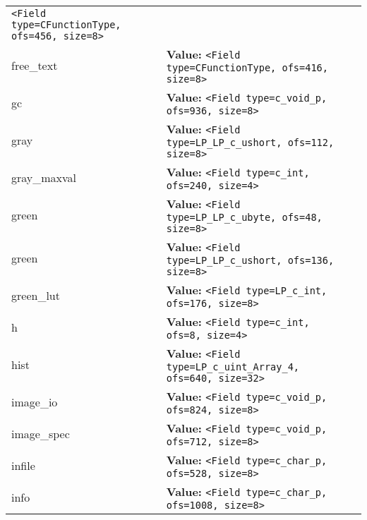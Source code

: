 \begin{longtable}{|p{\varnamewidth}|p{\vardescrwidth}|l}
{\tt {\textless}Field type=CFunctionType, ofs=456, size=8{\textgreater}}&\\
\cline{1-2}
\raggedright f\-r\-e\-e\-\_\-t\-e\-x\-t\- & \raggedright \textbf{Value:} 
{\tt {\textless}Field type=CFunctionType, ofs=416, size=8{\textgreater}}&\\
\cline{1-2}
\raggedright g\-c\- & \raggedright \textbf{Value:} 
{\tt {\textless}Field type=c\_void\_p, ofs=936, size=8{\textgreater}}&\\
\cline{1-2}
\raggedright g\-r\-a\-y\- & \raggedright \textbf{Value:} 
{\tt {\textless}Field type=LP\_LP\_c\_ushort, ofs=112, size=8{\textgreater}}&\\
\cline{1-2}
\raggedright g\-r\-a\-y\-\_\-m\-a\-x\-v\-a\-l\- & \raggedright \textbf{Value:} 
{\tt {\textless}Field type=c\_int, ofs=240, size=4{\textgreater}}&\\
\cline{1-2}
\raggedright g\-r\-e\-e\-n\- & \raggedright \textbf{Value:} 
{\tt {\textless}Field type=LP\_LP\_c\_ubyte, ofs=48, size=8{\textgreater}}&\\
\cline{1-2}
\raggedright g\-r\-e\-e\-n\-1\-6\- & \raggedright \textbf{Value:} 
{\tt {\textless}Field type=LP\_LP\_c\_ushort, ofs=136, size=8{\textgreater}}&\\
\cline{1-2}
\raggedright g\-r\-e\-e\-n\-\_\-l\-u\-t\- & \raggedright \textbf{Value:} 
{\tt {\textless}Field type=LP\_c\_int, ofs=176, size=8{\textgreater}}&\\
\cline{1-2}
\raggedright h\- & \raggedright \textbf{Value:} 
{\tt {\textless}Field type=c\_int, ofs=8, size=4{\textgreater}}&\\
\cline{1-2}
\raggedright h\-i\-s\-t\- & \raggedright \textbf{Value:} 
{\tt {\textless}Field type=LP\_c\_uint\_Array\_4, ofs=640, size=32{\textgreater}}&\\
\cline{1-2}
\raggedright i\-m\-a\-g\-e\-\_\-i\-o\- & \raggedright \textbf{Value:} 
{\tt {\textless}Field type=c\_void\_p, ofs=824, size=8{\textgreater}}&\\
\cline{1-2}
\raggedright i\-m\-a\-g\-e\-\_\-s\-p\-e\-c\- & \raggedright \textbf{Value:} 
{\tt {\textless}Field type=c\_void\_p, ofs=712, size=8{\textgreater}}&\\
\cline{1-2}
\raggedright i\-n\-f\-i\-l\-e\- & \raggedright \textbf{Value:} 
{\tt {\textless}Field type=c\_char\_p, ofs=528, size=8{\textgreater}}&\\
\cline{1-2}
\raggedright i\-n\-f\-o\- & \raggedright \textbf{Value:} 
{\tt {\textless}Field type=c\_char\_p, ofs=1008, size=8{\textgreater}}&\\

\end{longtable}
